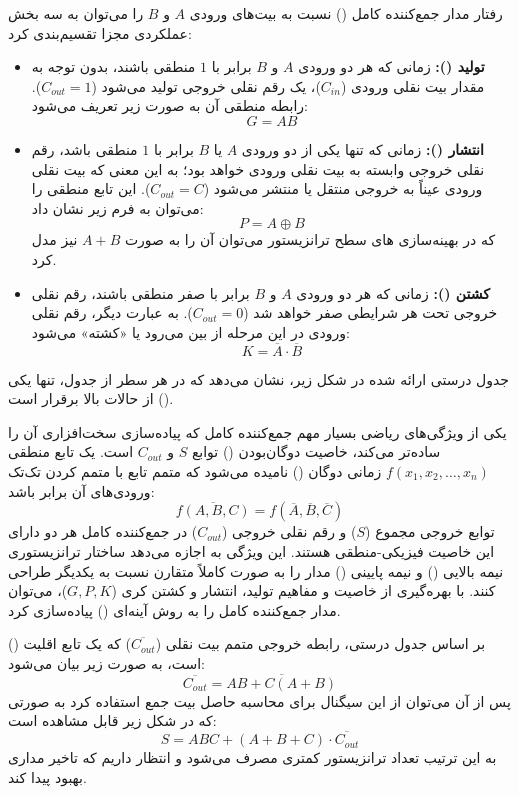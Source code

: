 رفتار مدار جمع‌کننده کامل () نسبت به بیت‌های ورودی $A$ و $B$ را می‌توان به سه بخش عملکردی مجزا تقسیم‌بندی کرد:
\begin{itemize}
    \item \textbf{تولید ():}
          زمانی که هر دو ورودی $A$ و $B$ برابر با $1$ منطقی باشند، بدون توجه به مقدار بیت نقلی ورودی ($C_{in}$)، یک رقم نقلی خروجی تولید می‌شود ($C_{out} = 1$). رابطه منطقی آن به صورت زیر تعریف می‌شود:
          $$
              G = A B
          $$
    \item \textbf{انتشار ():}
          زمانی که تنها یکی از دو ورودی $A$ یا $B$ برابر با $1$ منطقی باشد، رقم نقلی خروجی وابسته به بیت نقلی ورودی خواهد بود؛ به این معنی که بیت نقلی ورودی عیناً به خروجی منتقل یا منتشر می‌شود ($C_{out} = C$). این تابع منطقی را می‌توان به فرم زیر نشان داد:
          $$
              P = A \oplus B
          $$
          که در بهینه‌سازی های سطح ترانزیستور می‌توان آن را به صورت $A + B$ نیز مدل کرد.
    \item \textbf{کشتن ():}
          زمانی که هر دو ورودی $A$ و $B$ برابر با صفر منطقی باشند، رقم نقلی خروجی تحت هر شرایطی صفر خواهد شد ($C_{out} = 0$). به عبارت دیگر، رقم نقلی ورودی در این مرحله از بین می‌رود یا «کشته» می‌شود:
          $$
              K = \overline{A} \cdot \overline{B}
          $$
\end{itemize}

جدول درستی ارائه شده در شکل زیر، نشان می‌دهد که در هر سطر از جدول، تنها یکی از حالات بالا برقرار است ().


یکی از ویژگی‌های ریاضی بسیار مهم جمع‌کننده کامل که پیاده‌سازی سخت‌افزاری آن را ساده‌تر می‌کند، خاصیت د‌وگان‌بودن
() توابع $S$ و $C_{out}$ است.
یک تابع منطقی $f(x_1, x_2, \dots, x_n)$ زمانی دوگان () نامیده می‌شود که متمم تابع با متمم کردن تک‌تک ورودی‌های آن برابر باشد:
$$
    \overline{f(A, B, C)} = f(\overline{A}, \overline{B}, \overline{C})
$$
توابع خروجی مجموع ($S$) و رقم نقلی خروجی ($C_{out}$) در جمع‌کننده کامل هر دو دارای این خاصیت فیزیکی-منطقی هستند. این ویژگی به اجازه می‌دهد ساختار ترانزیستوری نیمه بالایی () و نیمه پایینی () مدار را به صورت کاملاً متقارن نسبت به یکدیگر طراحی کنند.
با بهره‌گیری از خاصیت  و مفاهیم تولید، انتشار و کشتن کری ($G, P, K$)، می‌توان مدار جمع‌کننده کامل را به روش آینه‌ای () پیاده‌سازی کرد.

بر اساس جدول درستی، رابطه خروجی متمم بیت نقلی ($\overline{C_{out}}$) که یک تابع اقلیت () است، به صورت زیر بیان می‌شود:
$$
    \overline{C_{out}} = \overline{AB + C(A+B)}
$$
پس از آن می‌توان از این سیگنال برای محاسبه حاصل بیت جمع استفاده کرد به صورتی که در شکل زیر قابل مشاهده است:
$$
    S = ABC + (A + B + C) \cdot \overline{C_{out}}
$$
به این ترتیب تعداد ترانزیستور کمتری مصرف می‌شود و انتظار داریم که تاخیر مداری بهبود پیدا کند.


